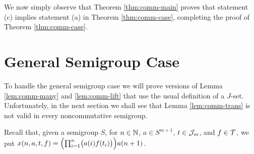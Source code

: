 We now simply observe that Theorem \ref{thm:comm-main} proves that statement (c) implies statement (a) in Theorem \ref{thm:comm-case}, completing the proof of Theorem \ref{thm:comm-case}.

\section{General Semigroup Case}
To handle the general semigroup case we will prove versions of Lemma \ref{lem:comm-many} and \ref{lem:comm-lift} that use the usual definition of a $J$-set. 
Unfortunately, in the next section we shall see that Lemma \ref{lem:comm-trans} is not valid in every noncommutative semigroup. 

Recall that, given a semigroup $S$, for $n \in \mathbb{N}$, $a \in S^{m+1}$, $t \in \mathcal{J}_m$, and $f \in \mathcal{T}$, we put $x(n, a, t, f) = \Bigl( \prod_{i=1}^n \bigl( a(i) f(t_i) \bigr) \Bigr) a(n+1)$. 

